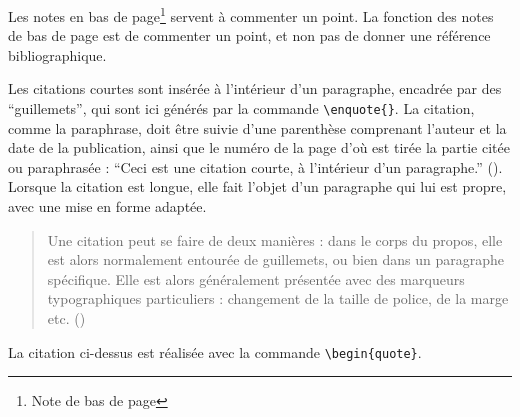 Les notes en bas de page\footnote{Note de bas de page} servent à commenter un point. La fonction des notes de bas de page est de commenter un point, et non pas de donner une référence bibliographique.

Les citations courtes sont insérée à l'intérieur d'un paragraphe, encadrée par des \enquote{guillemets}, qui sont ici générés par la commande \verb?\enquote{}?. La citation, comme la paraphrase, doit être suivie d'une parenthèse comprenant l'auteur et la date de la publication, ainsi que le numéro de la page d'où est tirée la partie citée ou paraphrasée : \enquote{Ceci est une citation courte, à l'intérieur d'un paragraphe.} (\cite[54]{bertholet_livres_1890}). Lorsque la citation est longue, elle fait l'objet d'un paragraphe qui lui est propre, avec une mise en forme adaptée.

\begin{quote}
	Une citation peut se faire de deux manières : dans le corps du propos, elle est alors normalement entourée de guillemets, ou bien dans un paragraphe spécifique. Elle est alors	généralement présentée avec des marqueurs typographiques particuliers : changement de la taille de police, de la marge etc.
(\cite[45]{rouquette_xelatex_2012})\end{quote}

La citation ci-dessus est réalisée avec la commande \verb?\begin{quote}?.

